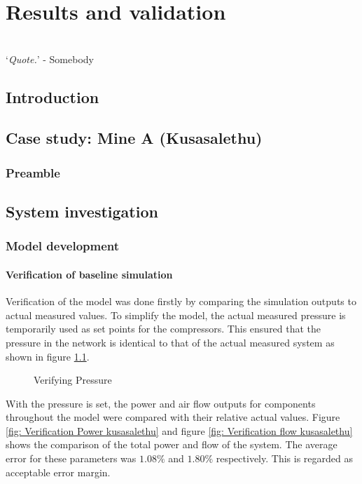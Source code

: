 \chapter{Results and validation}
\thispagestyle{empty}
\vspace{38em}
\hrulefill
\\
\enquote*{\textit{Quote.}} - Somebody\\
\newpage
\section{Introduction}
\section{Case study: Mine A \color{blue}(Kusasalethu)}
	\subsection{Preamble}
	\section{System investigation}
	
	\subsection{Model development}
	
	\subsubsection{Verification of baseline simulation}
	Verification of the model was done firstly by comparing the simulation outputs to actual measured values. To simplify the model, the actual measured pressure is temporarily used as set points for the compressors. This ensured that the pressure in the network is identical to that of the actual measured system as shown in figure \ref{fig: Verification Pressure kusasalethu}.
	\par 
	
	\begin{figure}[h]
		\centering
		\fbox{}
		\caption{Verifying Pressure}
		\label{fig: Verification Pressure kusasalethu}
	\end{figure}

 	With the pressure is set, the power and air flow outputs for components throughout the model were compared with their relative actual values. Figure \ref{fig: Verification Power kusasalethu} and figure \ref{fig: Verification flow kusasalethu} shows the comparison of the total power and flow of the system. The average error for these parameters was $1.08 \%$ and $1.80 \%$ respectively. This is regarded as acceptable error margin. 
 
